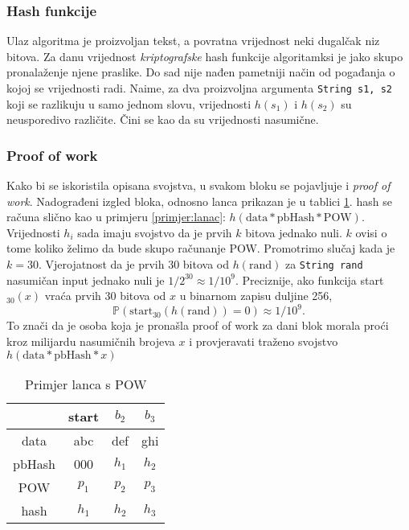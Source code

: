 \documentclass[12pt]{scrartcl} %
\newcommand{\tt}[1]{
\text{#1}
}
\begin{document}
\subsubsection{Hash funkcije}
Ulaz algoritma je proizvoljan tekst, a povratna vrijednost neki dugalčak niz bitova. Za danu vrijednost \emph{kriptografske} hash funkcije algoritamksi je jako skupo pronalaženje njene praslike. Do sad nije nađen pametniji način od pogađanja o kojoj se vrijednosti radi. Naime, za dva proizvoljna argumenta \texttt{String s1, s2} koji se razlikuju u samo jednom slovu, vrijednosti $h(s_1)$ i $h(s_2)$ su neusporedivo različite. Čini se kao da su vrijednosti nasumične. 

\subsubsection{Proof of work}
Kako bi se iskoristila opisana svojstva, u svakom bloku se pojavljuje i \emph{proof of work}. Nadograđeni izgled bloka, odnosno lanca prikazan je u tablici \ref{tab:e3}. hash se računa slično kao u primjeru \ref{primjer:lanac}: $h(\tt{data} * \tt{pbHash} * \tt{POW})$. Vrijednosti $h_i$ sada imaju svojstvo da je prvih $k$ bitova jednako nuli. $k$ ovisi o tome koliko želimo da bude skupo računanje POW. Promotrimo slučaj kada je $k = 30$. Vjerojatnost da je prvih 30 bitova od $h(\tt{rand})$ za \texttt{String rand} nasumičan input jednako nuli je $1/{2^{30}} \approx 1/10^{9}$. Preciznije, ako funkcija start$_{30}(x)$ vraća prvih 30 bitova od $x$ u binarnom zapisu duljine 256,
\[\mathbb{P}(\tt{start}_{30}(h(\tt{rand})) = 0) \approx 1/10^{9}.\]
To znači da je osoba koja je pronašla proof of work za dani blok morala proći kroz milijardu nasumičnih brojeva $x$ i provjeravati traženo svojstvo $h(\tt{data} * \tt{pbHash} * x)$
\begin{table}[ht]
    \centering
    \begin{tabular}{|c|c|c|c|}
        \hline
        & start & $b_2$ & $b_3$ \\
        \hline
        data & abc & def & ghi \\
        \hline 
        pbHash & 000 & $h_1$ & $h_2$ \\
        \hline
        POW & $p_1$ & $p_2$ & $p_3$ \\
        \hline
        hash & $h_1$ & $h_2$ & $h_3$ \\
        \hline
    \end{tabular}
    \caption{Primjer lanca s POW}
    \label{tab:e3}
\end{table}
\end{document}
